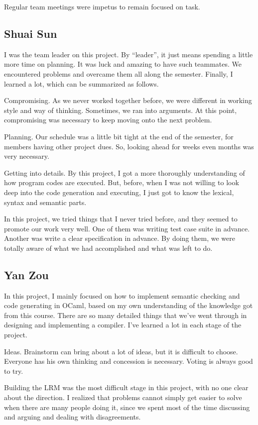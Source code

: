 \documentclass[12pt,psfig,a4]{article}
\begin{document}
Regular team meetings were impetus to remain focused on task.


\subsection{Shuai Sun}
I was the team leader on this project. By ``leader'', it just means spending a little more time on planning. It was luck and amazing to have such teammates. We encountered problems and overcame them all along the semester. Finally, I learned a lot, which can be summarized as follows.

Compromising. As we never worked together before, we were different in working style and way of thinking. Sometimes, we ran into arguments. At this point, compromising was necessary to keep moving onto the next problem.

Planning. Our schedule was a little bit tight at the end of the semester, for members having other project dues. So, looking ahead for weeks even months was very necessary. 

Getting into details. By this project, I got a more thoroughly understanding of how program codes are executed. But, before, when I was not willing to look deep into the code generation and executing, I just got to know the lexical, syntax and semantic parts.

In this project, we tried things that I never tried before, and they seemed to promote our work very well. One of them was writing test case suite in advance. Another was write a clear specification in advance. By doing them, we were totally aware of what we had accomplished and what was left to do.

\subsection{Yan Zou}
In this project, I mainly focused on how to implement semantic checking and code generating in OCaml, based on my own understanding of the knowledge got from this course. There are so many detailed things that we've went through in designing and implementing a compiler. I've learned a lot in each stage of the project.

Ideas. Brainstorm can bring about a lot of ideas, but it is difficult to choose. Everyone has his own thinking and concession is necessary. Voting is always good to try.

Building the LRM was the most difficult stage in this project, with no one clear about the direction. I realized that problems cannot simply get easier to solve when there are many people doing it, since we spent most of the time discussing and arguing and dealing with disagreements.
\end{document}
